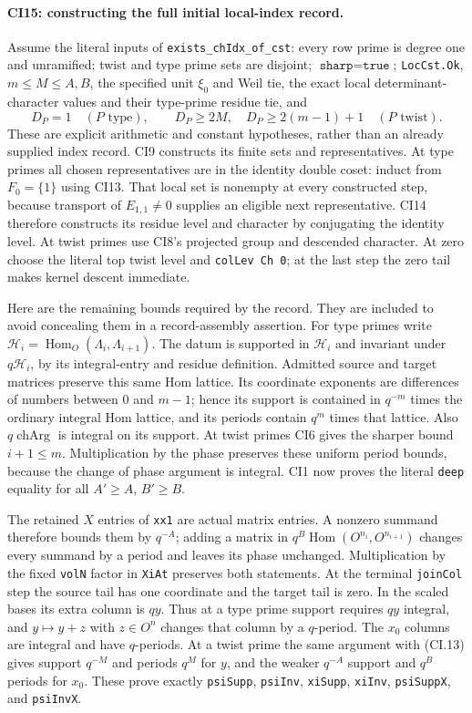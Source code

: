 \paragraph{CI15: constructing the full initial local-index record.}
Assume the literal inputs of \texttt{exists\_chIdx\_of\_cst}:
every row prime is degree one and unramified; twist and type
prime sets are disjoint; $\texttt{sharp}=\texttt{true}$;
\texttt{LocCst.Ok}, $m\le M\le A,B$, the specified unit $\xi_0$
and Weil tie, the exact local determinant-character values and
their type-prime residue tie, and
\[
 D_P=1\quad(P\text{ type}),\qquad
 D_P\ge2M,\quad D_P\ge2(m-1)+1\quad(P\text{ twist}).
 \tag{CI.31}
\]
These are explicit arithmetic and constant hypotheses, rather
than an already supplied index record. CI9 constructs its finite
sets and representatives. At type primes all chosen representatives
are in the identity double coset: induct from $F_0=\{1\}$ using
CI13. That local set is nonempty at every constructed step,
because transport of $E_{1,1}\ne0$ supplies an eligible next
representative. CI14 therefore constructs its residue level and
character by conjugating the identity level. At twist primes use
CI8's projected group and descended character. At zero choose
the literal top twist level and \texttt{colLev Ch 0}; at the last
step the zero tail makes kernel descent immediate.

Here are the remaining bounds required by the record. They are
included to avoid concealing them in a record-assembly assertion.
For type primes write $\mathcal H_i=\operatorname{Hom}_O
(\Lambda_i,\Lambda_{i+1})$. The datum is supported in
$\mathcal H_i$ and invariant under $q\mathcal H_i$, by its
integral-entry and residue definition. Admitted source and target
matrices preserve this same Hom lattice. Its coordinate exponents
are differences of numbers between $0$ and $m-1$; hence its
support is contained in $q^{-m}$ times the ordinary integral Hom
lattice, and its periods contain $q^m$ times that lattice.
Also $q\operatorname{chArg}$ is integral on its support.
At twist primes CI6 gives the sharper bound $i+1\le m$.
Multiplication by the phase preserves these uniform period
bounds, because the change of phase argument is integral.
CI1 now proves the literal \texttt{deep} equality for all
$A'\ge A$, $B'\ge B$.

The retained $X$ entries of \texttt{xx1} are actual matrix
entries. A nonzero summand therefore bounds them by $q^{-A}$;
adding a matrix in $q^B\operatorname{Hom}(O^{n_i},O^{n_{i+1}})$
changes every summand by a period and leaves its phase unchanged.
Multiplication by the fixed \texttt{volN} factor in
\texttt{XiAt} preserves both statements. At the terminal
\texttt{joinCol} step the source tail has one coordinate and
the target tail is zero. In the scaled bases its extra column
is $q y$. Thus at a type prime support requires $q y$ integral,
and $y\mapsto y+z$ with $z\in O^n$ changes that column by a
$q$-period. The $x_0$ columns are integral and have $q$-periods.
At a twist prime the same argument with (CI.13) gives support
$q^{-M}$ and periods $q^M$ for $y$, and the weaker $q^{-A}$
support and $q^B$ periods for $x_0$. These prove exactly
\texttt{psiSupp}, \texttt{psiInv}, \texttt{xiSupp},
\texttt{xiInv}, \texttt{psiSuppX}, and \texttt{psiInvX}.

